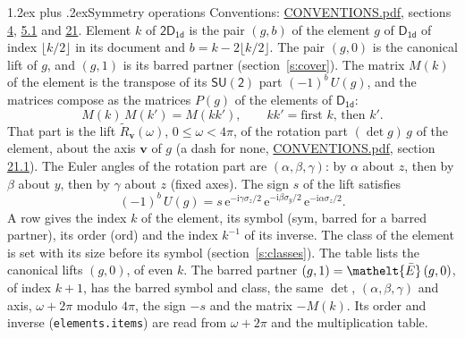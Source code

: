 \documentclass[10pt,a4paper]{article}
\makeatletter
\renewcommand\section{\@startsection{section}{1}{\z@}{-3ex plus -1ex minus -.2ex}%
  {1.2ex plus .2ex}{\normalfont\large\sffamily\bfseries\color{parttitle}}}
\numberwithin{equation}{section}
\newcommand{\eltfont}[1]{{\let\sigma\eltsigma\mathelt{#1}}}
\newcommand{\grp}[1]{\mathsf{#1}}
\newcommand{\elt}[1]{\eltfont{#1}}
\newcommand{\vv}{\mathbf{v}}
\newcommand{\iunit}{\mathrm{i}}
\newcommand{\expe}{\mathrm{e}}
\newcommand{\barred}[1]{\bar{#1}}
\newcommand{\lift}[1]{\tilde{#1}}
\newcommand{\pauli}[1]{\sigma_{#1}}
\makeatother
\begin{document}
\section{Symmetry operations}\label{s:elements}
Conventions: \href{../../CONVENTIONS.pdf}{CONVENTIONS.pdf}, sections \href{../../../rotation/CONVENTIONS.pdf\#conv.4}{4}, \href{../../../rotation/CONVENTIONS.pdf\#conv.5.1}{5.1} and \href{../../CONVENTIONS.pdf\#conv.21}{21}.
\leavevmode\label{n:index.element}\label{n:element.g}Element $k$ of $\grp{2D_{1d}}$ is the pair $(g, b)$ of the element $g$ of \href{../../../rotation/data/pdf/D1d.pdf}{$\grp{D_{1d}}$} of index $\lfloor k/2\rfloor$ in its document and $b = k - 2\lfloor k/2\rfloor$. The pair $(g, 0)$ is the canonical lift of $g$, and $(g, 1)$ is its barred partner (section~\ref{s:cover}). \label{n:matrix.element.pin}\label{n:matrix.element}The matrix $M(k)$ of the element is the transpose of its $\grp{SU(2)}$ part $(-1)^{b}\,U(g)$, and the matrices compose as the matrices $P(g)$ of the elements of $\grp{D_{1d}}$:
\begin{equation}\label{e:mprod}M(k)\,M(k') = M(kk'),\qquad kk' = \text{first } k\text{, then } k'.\end{equation}
\leavevmode\label{n:angle.omega}\label{n:vector.axis}\label{n:vector.pole}That part is the lift $\lift{R}_{\vv}(\omega)$, $0 \le \omega < 4\pi$, of the rotation part $(\det g)\,g$ of the element, about the axis $\vv$ of $g$ (a dash for none, \href{../../CONVENTIONS.pdf}{CONVENTIONS.pdf}, section \href{../../CONVENTIONS.pdf\#conv.21.1}{21.1}). \label{n:angle.euler.alpha}\label{n:angle.euler.beta}\label{n:angle.euler.gamma}\label{n:vector.coordinates}The Euler angles of the rotation part are $(\alpha,\beta,\gamma)$: by $\alpha$ about $z$, then by $\beta$ about $y$, then by $\gamma$ about $z$ (fixed axes). \label{n:local.euler.sign}The sign $s$ of the lift satisfies
\begin{equation}\label{e:euler}(-1)^{b}\,U(g) = s\,\expe^{-\iunit\gamma\pauli{z}/2}\,\expe^{-\iunit\beta\pauli{y}/2}\,\expe^{-\iunit\alpha\pauli{z}/2}.\end{equation}
\leavevmode\label{n:index.element.inverse}\label{n:head.sym}\label{n:head.ord}A row gives the index $k$ of the element, its symbol (sym, barred for a barred partner), its order (ord) and the index $k^{-1}$ of its inverse. \label{n:head.class}The class of the element is set with its size before its symbol (section~\ref{s:classes}).
The table lists the canonical lifts $(g, 0)$, of even $k$. The barred partner $(g, 1) = \elt{\barred{E}}\,(g, 0)$, of index $k + 1$, has the barred symbol and class, the same $\det$, $(\alpha,\beta,\gamma)$ and axis, $\omega + 2\pi$ modulo $4\pi$, the sign $-s$ and the matrix $-M(k)$. Its order and inverse (\texttt{elements.items}) are read from $\omega + 2\pi$ and the multiplication table.
\end{document}
